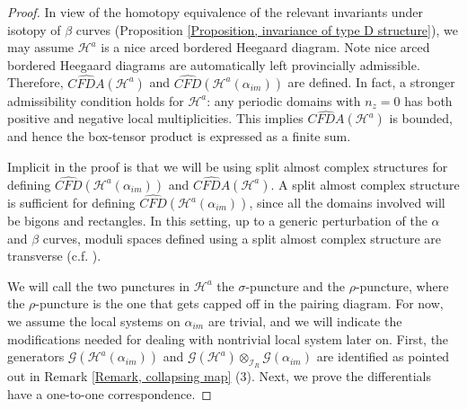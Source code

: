 \documentclass{amsart}
\theoremstyle{definition}
\theoremstyle{remark}
\numberwithin{equation}{section}
\numberwithin{equation}{section} \makeatletter
\begin{document}
\FirstPairingTheorem*
\begin{proof}
In view of the homotopy equivalence of the relevant invariants under isotopy of $\beta$ curves (Proposition \ref{Proposition, invariance of type D structure}), we may assume $\mathcal{H}^a$ is a nice arced bordered Heegaard diagram. Note nice arced bordered Heegaard diagrams are automatically left provincially admissible. Therefore, $\widehat{CFDA}(\mathcal{H}^a)$ and $\widehat{CFD}(\mathcal{H}^a({\alpha_{im}}))$ are defined. In fact, a stronger admissibility condition holds for $\mathcal{H}^a$: any periodic domains with $n_z=0$ has both positive and negative local multiplicities. This implies $\widehat{CFDA}(\mathcal{H}^a)$ is bounded, and hence the box-tensor product is expressed as a finite sum. 
 
Implicit in the proof is that we will be using split almost complex structures for defining $\widehat{CFD}(\mathcal{H}^a({\alpha_{im}}))$ and $\widehat{CFDA}(\mathcal{H}^a)$. A split almost complex structure is sufficient for defining $\widehat{CFD}(\mathcal{H}^a({\alpha_{im}}))$, since all the domains involved will be bigons and rectangles. In this setting, up to a generic perturbation of the $\alpha$ and $\beta$ curves, moduli spaces defined using a split almost complex structure are transverse (c.f. \cite[Proposition 3.9]{MR2240908}).

We will call the two punctures in $\mathcal{H}^a$ the $\sigma$-puncture and the $\rho$-puncture, where the $\rho$-puncture is the one that gets capped off in the pairing diagram. For now, we assume the local systems on $\alpha_{im}$ are trivial, and we will indicate the modifications needed for dealing with nontrivial local system later on. First, the generators $\mathcal{G}(\mathcal{H}^a(\alpha_{im}))$ and $\mathcal{G}(\mathcal{H}^a)\otimes_{\mathcal{I}_R}\mathcal{G}(\alpha_{im})$ are identified as pointed out in Remark \ref{Remark, collapsing map} (3).  Next, we prove the differentials have a one-to-one correspondence.


\end{proof}
\end{document}
